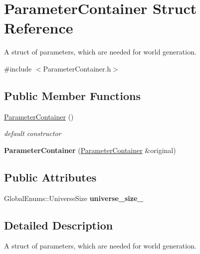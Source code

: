 \hypertarget{struct_parameter_container}{\section{Parameter\-Container Struct Reference}
\label{struct_parameter_container}
}


A struct of parameters, which are needed for world generation.  




{\ttfamily \#include $<$Parameter\-Container.\-h$>$}

\subsection*{Public Member Functions}
\begin{DoxyCompactItemize}
\item 
\hyperlink{struct_parameter_container_acf7a05b68a524c8427edf954efd675bb}{Parameter\-Container} ()
\begin{DoxyCompactList}\small\item\em default constructor \end{DoxyCompactList}\item 
\hypertarget{struct_parameter_container_ac7fa0076a1a8aa5c256640922ac1983f}{{\bfseries Parameter\-Container} (\hyperlink{struct_parameter_container}{Parameter\-Container} \&original)}\label{struct_parameter_container_ac7fa0076a1a8aa5c256640922ac1983f}

\end{DoxyCompactItemize}
\subsection*{Public Attributes}
\begin{DoxyCompactItemize}
\item 
Global\-Enums\-::\-Universe\-Size {\bfseries universe\-\_\-size\-\_\-}
\end{DoxyCompactItemize}


\subsection{Detailed Description}
A struct of parameters, which are needed for world generation. 

